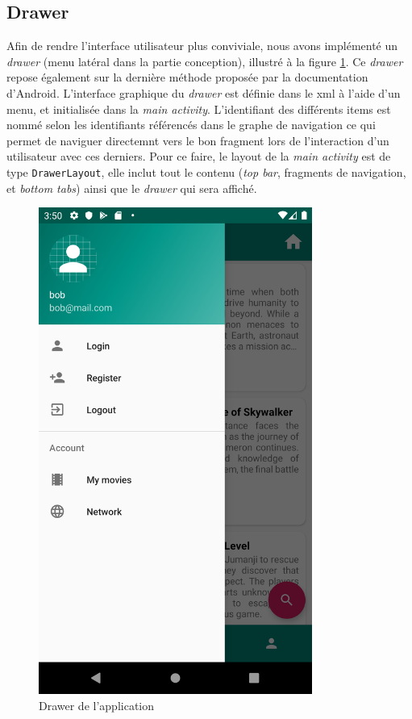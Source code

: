 \subsection{Drawer}
Afin de rendre l'interface utilisateur plus conviviale, nous avons implémenté un \textit{drawer} (menu latéral dans la partie conception), illustré à la figure \ref{drawer}. Ce \textit{drawer} repose également sur la dernière méthode proposée par la documentation d'Android. L'interface graphique du \textit{drawer} est définie dans le \acrshort{xml} à l'aide d'un menu, et initialisée dans la \textit{main activity}. L'identifiant des différents items est nommé selon les identifiants référencés dans le graphe de navigation ce qui permet de naviguer directemnt vers le bon fragment lors de l'interaction d'un utilisateur avec ces derniers. Pour ce faire, le layout de la \textit{main activity} est de type \texttt{DrawerLayout}, elle inclut tout le contenu (\textit{top bar}, fragments de navigation, et \textit{bottom tabs}) ainsi que le \textit{drawer} qui sera affiché.
\begin{figure}
    \begin{center}
        \includegraphics[width=0.8\textwidth]{img/screenshots/Drawer.png}
    \end{center}
    \caption{Drawer de l'application}
    \label{drawer}
\end{figure}

